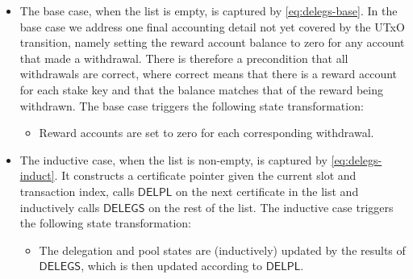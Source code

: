 \begin{itemize}
  \item The base case, when the list is empty, is captured by \cref{eq:delegs-base}.
    In the base case we address one final accounting detail not yet covered by the UTxO
    transition, namely setting the reward account balance to zero for any account that made a
    withdrawal.  There is therefore a precondition that all withdrawals are correct, where
    correct means that there is a reward account for each stake key and that the balance
    matches that of the reward being withdrawn.
    The base case triggers the following state transformation:
    \begin{itemize}
      \item Reward accounts are set to zero for each corresponding withdrawal.
    \end{itemize}
  \item The inductive case, when the list is non-empty, is captured by \cref{eq:delegs-induct}.
    It constructs a certificate pointer given the current slot and transaction index,
    calls $\mathsf{DELPL}$ on the next certificate in the list and inductively
    calls $\mathsf{DELEGS}$ on the rest of the list.
    The inductive case triggers the following state transformation:
    \begin{itemize}
      \item The delegation and pool states are (inductively) updated by the results of
        $\mathsf{DELEGS}$, which is then updated according to $\mathsf{DELPL}$.
    \end{itemize}
\end{itemize}

